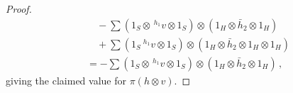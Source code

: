 \documentclass[11pt]{amsart}
\numberwithin{equation}{section}
\DeclareMathOperator{\AW}{AW}
\DeclareMathOperator{\AWt}{\AW^{\tau}}
\renewcommand{\_}[1]{\mbox{$_{\left( #1 \right)}$}}
\newcommand{\ot}{\otimes}
\begin{document}
{\begin{proof}
\begin{equation*}
\begin{aligned}
& \quad   - \sum (1_S \ot \, ^{h_1} v\ot 1_S)\ot (1_H\ot \bar h_2\ot 1_H)\\
&\quad   +  \sum (1_S \ ^{h_1} v\ot 1_S)\ot (1_H\ot \bar h_2\ot 1_H\ot 1_H) \\
 & = 
  - \sum (1_S \ot \, ^{h_1} v\ot 1_S)\ot (1_H\ot \bar h_2\ot 1_H) \, ,
\end{aligned}
\end{equation*}
    giving the claimed value for $\pi(h\ot v)$.
    

\end{proof}}
\end{document}
